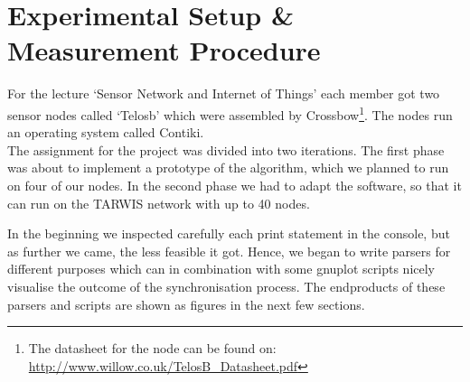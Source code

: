 \documentclass{llncs}
\begin{document}
\section{Experimental Setup \& Measurement Procedure}
For the lecture `Sensor Network and Internet of Things' each member got two sensor nodes called `Telosb' which were assembled by Crossbow\footnote{The datasheet for the node can be found on: \url{http://www.willow.co.uk/TelosB_Datasheet.pdf}}. The nodes run an operating system called Contiki.\\
The assignment for the project was divided into two iterations. The first phase was about to implement a prototype of the algorithm, which we planned to run on four of our nodes. In the second phase we had to adapt the software, so that it can run on the TARWIS network with up to 40 nodes.



In the beginning we inspected carefully each print statement in the console, but as further we came, the less feasible it got. Hence, we began to write parsers for different purposes which can in combination with some gnuplot scripts nicely visualise the outcome of the synchronisation process. The endproducts of these parsers and scripts are shown as figures in the next few sections.
\end{document}
